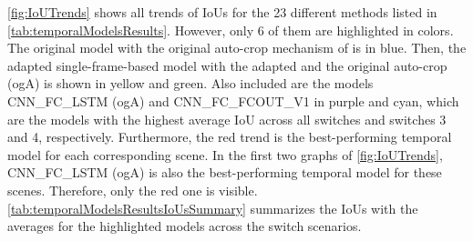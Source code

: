 \autoref{fig:IoUTrends} shows all trends of \ac{IoU}s for the 23 different methods listed in \autoref{tab:temporalModelsResults}.
However, only 6 of them are highlighted in colors.
The original model with the original auto-crop mechanism of \cite{tepNet2024} is in blue.
Then, the adapted single-frame-based model with the adapted and the original auto-crop (ogA) is shown in yellow and green.
Also included are the models CNN\_FC\_LSTM (ogA) and CNN\_FC\_FCOUT\_V1 in purple and cyan, which are the models with the highest average \ac{IoU} across all switches and switches 3 and 4, respectively.
Furthermore, the red trend is the best-performing temporal model for each corresponding scene.
In the first two graphs of \autoref{fig:IoUTrends}, CNN\_FC\_LSTM (ogA) is also the best-performing temporal model for these scenes.
Therefore, only the red one is visible.
\autoref{tab:temporalModelsResultsIoUsSummary} summarizes the \ac{IoU}s with the averages for the highlighted models across the switch scenarios.

%
%
%


